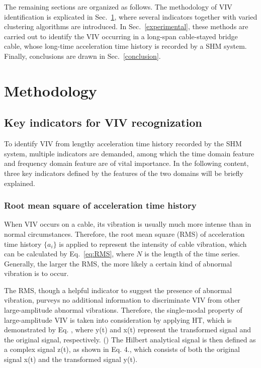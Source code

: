 \documentclass[preprint, 3p, times, compress, 11pt]{elsarticle}
\begin{document}
The remaining sections are organized as follows. The methodology of VIV 
identification is explicated in Sec.~\ref{sec:method}, where several 
indicators together with varied clustering algorithms are introduced. 
In Sec.~\ref{experimental}, these methods are carried out to identify 
the VIV occurring in a long-span cable-stayed bridge cable, whose 
long-time acceleration time history is recorded by a SHM system. Finally, 
conclusions are drawn in Sec.~\ref{conclusion}.

\section{Methodology}
\label{sec:method}

\subsection{Key indicators for VIV recognization} 

To identify VIV from lengthy acceleration time history recorded by the SHM 
system, multiple indicators are demanded, among which the time domain 
feature and frequency domain feature are of vital importance. In the 
following content, three key indicators defined by the features of the 
two domains will be briefly explained. 

\subsubsection{Root mean square of acceleration time history}

When VIV occurs on a cable, its vibration is usually much more intense 
than in normal circumstances. Therefore, the root mean square (RMS) of 
acceleration time history $\{a_i\}$ is applied to represent the intensity 
of cable vibration, which can be calculated by Eq.~\eqref{eq:RMS}, where 
$N$ is the length of the time series. Generally, the larger the RMS, the 
more likely a certain kind of abnormal vibration is to occur.

The RMS, though a helpful indicator to suggest the presence of abnormal 
vibration, purveys no additional information to discriminate VIV from other 
large-amplitude abnormal vibrations. Therefore, the single-modal property 
of large-amplitude VIV is taken into consideration by applying HT, 
which is demonstrated by Eq. , where y(t) and x(t) represent the 
transformed signal and the original signal, respectively. 
		()
The Hilbert analytical signal is then defined as a complex signal z(t), as shown in Eq. 4., which consists of both the original signal x(t) and the transformed signal y(t). 
\end{document}
